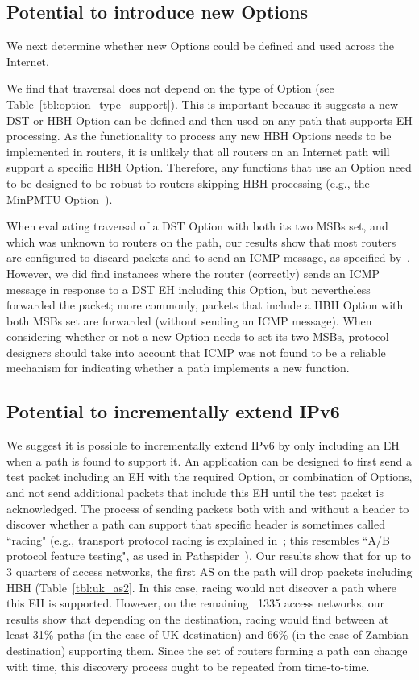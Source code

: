 \documentclass[conference]{IEEEtran}
\begin{document}
\subsection{Potential to introduce new Options}

We next determine whether new Options could be defined and used across the Internet.

We find that traversal does not depend on the type of Option  (see Table~\ref{tbl:option_type_support}). This is important because it suggests a new DST or HBH Option can be defined and then used on any path that supports EH processing. 
As the functionality to process any new HBH Options needs to be implemented in routers, it is unlikely that all routers on an Internet path will support a specific HBH Option. Therefore, any functions that use an Option need to be designed to be robust to routers skipping HBH processing (e.g., the MinPMTU  Option~\cite{rfc9268,rfc9343}). 

When evaluating traversal of a DST Option with both its two MSBs set, and which was unknown to routers on the path, our results show that most routers are configured to discard packets and to send an ICMP message, as specified by~\cite{RFC4443}. However, we did find instances where the router (correctly) sends an ICMP message in response to a DST EH including this Option, but nevertheless forwarded the packet; more commonly, packets that include a HBH Option with both MSBs set are forwarded (without sending an ICMP message). When considering whether or not a new Option needs to set its two MSBs, protocol designers should take into account that ICMP was not found to be a reliable mechanism for indicating whether a path implements a new function.

\subsection{Potential to incrementally extend IPv6}


We suggest it is possible to incrementally extend IPv6 by only including an EH when a path is found to support it. 
An application can be designed to first send a test packet including an EH with the required Option, or combination of Options, and not send additional packets that include this EH until the test packet is acknowledged. The process of sending packets both with and without a header to discover whether a path can support that specific header is sometimes called ``racing" (e.g., transport protocol racing is explained in~\cite{ietf-taps-arch-18}; this resembles ``A/B protocol feature testing", as used in Pathspider~\cite{learmonth2016pathspider}). Our results show that for up to 3 quarters of access networks, the first AS on the path will drop packets including HBH (Table~\ref{tbl:uk_as2}. In this case, racing would not discover a path where this EH is supported. However, on the remaining ~1335 access networks, our results show that depending on the destination, racing would find between at least 31\% paths (in the case of UK destination) and 66\% (in the case of Zambian destination) supporting them.
Since the set of routers forming a path can change with time, this discovery process ought to be repeated from time-to-time. 
\end{document}
